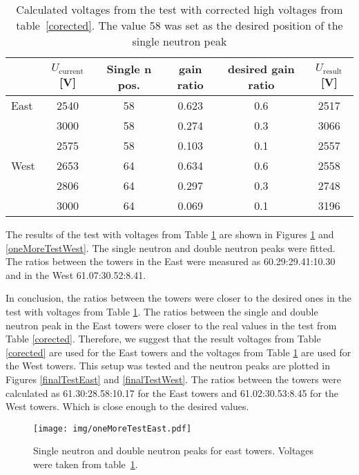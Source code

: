 \begin{table}[htb] 
\caption{Calculated voltages from the test with corrected high voltages from table~\ref{corected}.
The value 58 was set as the desired position of the single neutron peak}
\label{thirdCalib}
\begin{center}
\begin{tabular}{lccccc}
 \toprule
 &$U_\text{current}$[V]&Single n pos.&gain ratio&desired gain ratio&$U_\text{result}$[V]\\
\midrule
East  &2540  &58 &0.623  &0.6 &2517 \\
      &3000  &58 &0.274  &0.3 &3066 \\
      &2575  &58 &0.103	&0.1 &2557 \\
\midrule
West  &2653  &64 &0.634 &0.6 &2558 \\
      &2806  &64 &0.297 &0.3 &2748 \\
      &3000  &64 &0.069 &0.1 &3196 \\
\bottomrule
\end{tabular}
\end{center}
\end{table}

The results of the test with voltages from Table \ref{thirdCalib} are shown in
Figures \ref{oneMoreTestEast} and \ref{oneMoreTestWest}\@. The single neutron and double
neutron peaks were fitted. The ratios between the towers in the East were measured as
60.29:29.41:10.30 and in the West 61.07:30.52:8.41. 

In conclusion, the ratios between the towers were closer to the desired ones in the
test with voltages from Table \ref{thirdCalib}. The ratios between the single and double
neutron peak in the East towers were closer to the real values in the test from
Table \ref{corected}. Therefore, we suggest that the result voltages from Table \ref{corected}
are used for the East towers and the voltages from Table \ref{thirdCalib} are used for the
West towers. This setup was tested and the neutron peaks are plotted in Figures \ref{finalTestEast}
and \ref{finalTestWest}. The ratios between the towers were calculated as
61.30:28.58:10.17 for the East towers and 61.02:30.53:8.45 for the West towers.
Which is close enough to the desired values.

\begin{figure}[htb]
\begin{center}
\texttt{[image: img/oneMoreTestEast.pdf]}
\end{center}
\caption{Single neutron and double neutron peaks for east towers.
Voltages were taken from table~\ref{thirdCalib}.}
\label{oneMoreTestEast}
\end{figure}

